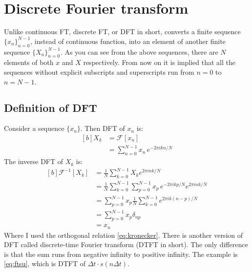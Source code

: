 \documentclass[letterpaper, 11pt]{article}
\newcommand{\fourier}[2]{\mathcal{F}_{#1}[#2]} %
\newcommand{\ifourier}[2]{\mathcal{F}_{#1}^{-1}[#2]} %
\newcommand{\ssum}[1]{\sum_{#1 = 0}^{N - 1}} %
\newcommand{\dft}[3]{\ssum{#1} #2 e^{-2\pi i#3#1/N}} %
\newcommand{\idft}[3]{\frac{1}{N}\ssum{#1} #2 e^{2\pi i#3#1/N}} %
\numberwithin{equation}{section}
\numberwithin{figure}{section}
\numberwithin{table}{section}
\begin{document}
\section{Discrete Fourier transform}
Unlike continuous FT, discrete FT, or DFT in short, converts a finite sequence \(\{x_{n}\}_{n=0}^{N-1} \), instead of continuous function, into an element of another finite sequence \( \{X_{n}\}_{n=0}^{N-1} \). As you can see from the above sequences, there are \(N\) elements of both \(x\) and \(X\) respectively. From now on it is implied that all the sequences without explicit subscripts and superscripts run from \(n=0\) to \(n=N-1\).   

\subsection{Definition of DFT}
Consider a sequence \(\{x_{n}\}\). Then DFT of \(x_{n}\) is:
\begin{equation}
	\begin{aligned}[b]
		X_{k}	&= \fourier{}{x_{n}}\\
			&= \dft{n}{x_{n}\,}{k}
	\end{aligned}
\end{equation}
The inverse DFT of \(X_{k}\) is:
\begin{equation}
	\begin{aligned}[b]
		\ifourier{}{X_{k}}
			&= \idft{k}{X_{k}}{n}\\
			&= \idft{k}{\dft{p}{x_{p}\,}{k}}{n}\\
			&= \ssum{p} x_{p} \frac{1}{N}\ssum{k} e^{2\pi ik(n-p)/N}\\
			&= \ssum{p} x_{p} \delta_{np}\\
			&= x_{n}
	\end{aligned}
\end{equation}
Where I used the orthogonal relation \eqref{eq:kronecker}. There is another version of DFT called discrete-time Fourier transform (DTFT in short). The only difference is that the sum runs from negative infinity to positive infinity. The example is \eqref{eq:ftsu}, which is DTFT of \(\Delta t\cdot s(n\Delta t)\). 

\clearpage
\pagestyle{plain}
\printbibliography
{}
\printindex
\end{document}
